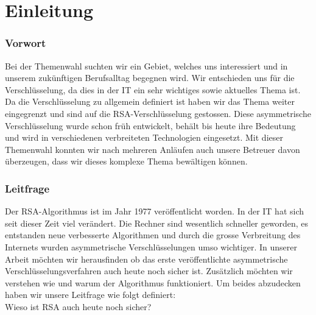 \part{Einleitung}
\section{Vorwort}
Bei der Themenwahl suchten wir ein Gebiet, welches uns interessiert und in unserem zukünftigen Berufsalltag begegnen wird. Wir entschieden uns für die Verschlüsselung, da dies in der IT ein sehr wichtiges sowie aktuelles Thema ist. Da die Verschlüsselung zu allgemein definiert ist haben wir das Thema weiter eingegrenzt und sind auf die RSA-Verschlüsselung gestossen. Diese asymmetrische Verschlüsselung wurde schon früh entwickelt, behält bis heute ihre Bedeutung und wird in verschiedenen verbreiteten Technologien eingesetzt. Mit dieser Themenwahl konnten wir nach mehreren Anläufen auch unsere Betreuer davon überzeugen, dass wir dieses komplexe Thema bewältigen können. 
%
\section{Leitfrage}
Der RSA-Algorithmus ist im Jahr 1977 veröffentlicht worden. In der IT hat sich seit dieser Zeit viel verändert. Die Rechner sind wesentlich schneller geworden, es entstanden neue verbesserte Algorithmen und durch die grosse Verbreitung des Internets wurden asymmetrische Verschlüsselungen umso wichtiger. In unserer Arbeit möchten wir herausfinden ob das erste veröffentlichte asymmetrische Verschlüsselungsverfahren auch heute noch sicher ist. Zusätzlich möchten wir verstehen wie und warum der Algorithmus funktioniert. Um beides abzudecken haben wir unsere Leitfrage wie folgt definiert:\\
Wieso ist RSA auch heute noch sicher?